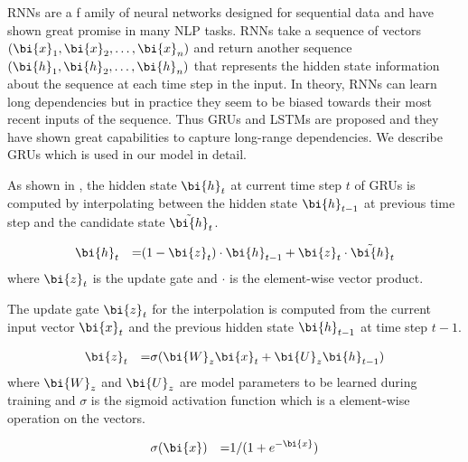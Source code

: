 RNNs are a f amily of neural networks designed for sequential data and have shown great promise in many NLP tasks. RNNs take a sequence of vectors $(\bi{x}_1, \bi{x}_2, \dots, \bi{x}_n)$ and return another sequence $(\bi{h}_1, \bi{h}_2, \dots, \bi{h}_n)$ that represents the hidden state information about the sequence at each time step in the input. In theory, RNNs can learn long dependencies but in practice they seem to be biased towards their most recent inputs of the sequence. Thus GRUs and LSTMs are proposed and they have shown great capabilities to capture long-range dependencies. We describe GRUs which is used in our model in detail.

As shown in , the hidden state $\bi{h}_t$ at current time step $t$ of GRUs is computed by interpolating between the hidden state $\bi{h}_{t-1}$ at previous time step and the candidate state $\tilde{\bi{h}}_t$.

\begin{equation}
\label{eqn:gru1}
\begin{aligned}
& \bi{h}_t & = & (1-\bi{z}_t)\cdot\bi{h}_{t-1}+\bi{z}_t\cdot\tilde{\bi{h}}_t\\
\end{aligned}
\end{equation}
\noindent
where $\bi{z}_t$ is the update gate and $\cdot$ is the element-wise vector product.

The update gate $\bi{z}_t$ for the interpolation is computed from the current input vector $\bi{x}_t$ and the previous hidden state $\bi{h}_{t-1}$ at time step $t-1$.

\begin{equation}
\label{eqn:gru2}
\begin{aligned}
& \bi{z}_t & = & \sigma(\bi{W}_z\bi{x}_t+\bi{U}_z\bi{h}_{t-1})\\
\end{aligned}
\end{equation}
\noindent
where $\bi{W}_z$ and $\bi{U}_z$ are model parameters to be learned during training and $\sigma$ is the sigmoid activation function which is a element-wise operation on the vectors.

\begin{equation}
\label{eqn:gru3}
\begin{aligned}
& \sigma(\bi{x}) & = & 1/(1+e^{-\bi{x}})\\
\end{aligned}
\end{equation}
\noindent

